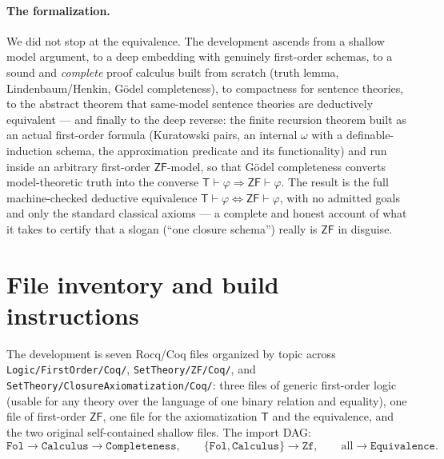 \documentclass[11pt]{article}
\theoremstyle{plain}
\theoremstyle{definition}
\newcommand{\ZF}{\mathsf{ZF}}
\renewcommand{\ZF}{\textsf{ZF}}
\newcommand{\T}{\textsf{T}}
\newcommand{\proves}{\vdash}
\begin{document}
\paragraph{The formalization.} We did not stop at the equivalence. The development
ascends from a shallow model argument, to a deep embedding with genuinely
first-order schemas, to a sound and \emph{complete} proof calculus built from
scratch (truth lemma, Lindenbaum/Henkin, G\"odel completeness), to compactness for
sentence theories, to the abstract theorem that same-model sentence theories are
deductively equivalent --- and finally to the deep reverse: the finite recursion
theorem built as an actual first-order formula (Kuratowski pairs, an internal
$\omega$ with a definable-induction schema, the approximation predicate and its
functionality) and run inside an arbitrary first-order $\ZF$-model, so that
G\"odel completeness converts model-theoretic truth into the converse
$\T \proves \varphi \Rightarrow \ZF \proves \varphi$. The result is the full
machine-checked deductive equivalence
$\T \proves \varphi \Leftrightarrow \ZF \proves \varphi$, with no admitted goals
and only the standard classical axioms --- a complete and honest account of what
it takes to certify that a slogan (``one closure schema'') really is $\ZF$ in
disguise.

\appendix
\section{File inventory and build instructions}

The development is seven Rocq/Coq files organized by topic across
\texttt{Logic/FirstOrder/Coq/}, \texttt{SetTheory/ZF/Coq/}, and
\texttt{SetTheory/ClosureAxiomatization/Coq/}: three files of generic
first-order logic (usable for any theory over the language of one binary
relation and equality), one file of first-order $\ZF$, one file for the
axiomatization $\T$ and the equivalence, and the two original self-contained
shallow files. The import DAG:
\[
  \texttt{Fol} \to \texttt{Calculus} \to \texttt{Completeness}, \qquad
  \{\texttt{Fol}, \texttt{Calculus}\} \to \texttt{Zf}, \qquad
  \text{all} \to \texttt{Equivalence}.
\]
\end{document}
